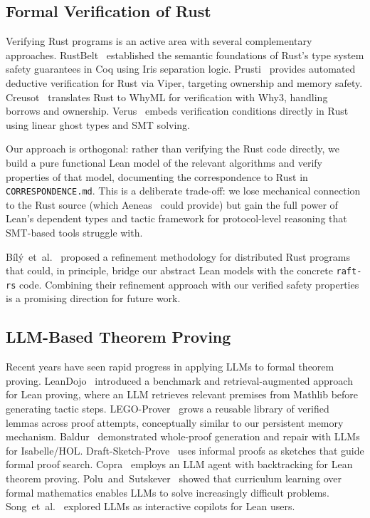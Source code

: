 \documentclass[sigconf,10pt]{acmart}
\begin{document}
\subsection{Formal Verification of Rust}

Verifying Rust programs is an active area with several complementary
approaches.  RustBelt~\cite{jung2018rustbelt} established the
semantic foundations of Rust's type system safety guarantees in Coq
using Iris separation logic.
Prusti~\cite{astrauskas2022prusti} provides automated deductive
verification for Rust via Viper, targeting ownership and memory
safety.
Creusot~\cite{denis2022creusot} translates Rust to WhyML for
verification with Why3, handling borrows and ownership.
Verus~\cite{lattuada2023verus} embeds verification conditions
directly in Rust using linear ghost types and SMT solving.

Our approach is orthogonal: rather than verifying the Rust code
directly, we build a pure functional Lean model of the relevant
algorithms and verify properties of that model, documenting the
correspondence to Rust in \texttt{CORRESPONDENCE.md}.  This is
a deliberate trade-off: we lose mechanical connection to the Rust
source (which Aeneas~\cite{aeneas} could provide) but gain the full
power of Lean's dependent types and tactic framework for
protocol-level reasoning that SMT-based tools struggle with.

B\'il\'y~et~al.~\cite{bily2025rust} proposed a refinement methodology
for distributed Rust programs that could, in principle, bridge our
abstract Lean models with the concrete \texttt{raft-rs} code.
Combining their refinement approach with our verified safety
properties is a promising direction for future work.

\subsection{LLM-Based Theorem Proving}

Recent years have seen rapid progress in applying LLMs to formal
theorem proving.  LeanDojo~\cite{yang2023leandojo} introduced a
benchmark and retrieval-augmented approach for Lean proving, where
an LLM retrieves relevant premises from Mathlib before generating
tactic steps.  LEGO-Prover~\cite{wang2024legoprover} grows a
reusable library of verified lemmas across proof attempts,
conceptually similar to our persistent memory mechanism.
Baldur~\cite{first2023baldur} demonstrated whole-proof generation
and repair with LLMs for Isabelle/HOL.
Draft-Sketch-Prove~\cite{jiang2023dsp} uses informal proofs as
sketches that guide formal proof search.
Copra~\cite{thakur2024copra} employs an LLM agent with
backtracking for Lean theorem proving.
Polu~and~Sutskever~\cite{polu2022formal} showed that curriculum
learning over formal mathematics enables LLMs to solve increasingly
difficult problems.
Song~et~al.~\cite{song2023towards} explored LLMs as interactive
copilots for Lean users.
\end{document}
